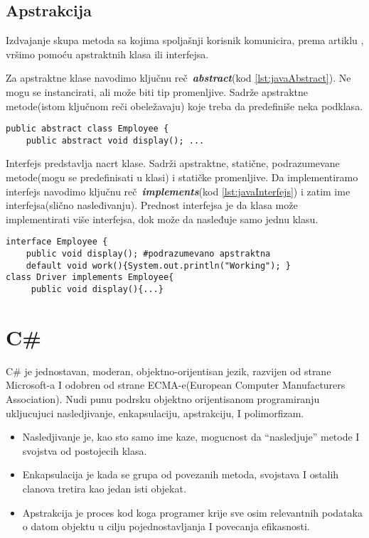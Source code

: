 \documentclass[a4paper]{article}
\begin{document}
\subsection{Apstrakcija}
\label{subsec:javaApstrakcija}

Izdvajanje skupa metoda sa kojima spoljašnji korisnik komunicira, prema artiklu \cite{oopJava}, vršimo pomoću apstraktnih klasa ili interfejsa.

Za apstraktne klase navodimo ključnu reč~{\em \textbf{abstract}}(kod \ref{lst:javaAbstract}). Ne mogu se instancirati, ali može biti tip promenljive. Sadrže apstraktne metode(istom ključnom reči obeležavaju) koje treba da predefiniše neka podklasa.

\begin{lstlisting}[caption={Apstraktna klasa},frame=single, label=lst:javaAbstract]
public abstract class Employee {
	public abstract void display(); ...
\end{lstlisting}

Interfejs predstavlja nacrt klase. Sadrži apstraktne, statične, podrazumevane metode(mogu se predefinisati u klasi) i statičke promenljive. Da implementiramo interfejs navodimo ključnu reč~{\em \textbf{implements}}(kod \ref{lst:javaInterfejs}) i zatim ime interfejsa(slično nasleđivanju). Prednost interfejsa\cite{horstmann2017core} je da klasa može implementirati više interfejsa, dok može da nasleđuje samo jednu klasu.

\begin{lstlisting}[caption={Interfejs},frame=single, label=lst:javaInterfejs]
interface Employee {
	public void display(); #podrazumevano apstraktna
	default void work(){System.out.println("Working"); }
class Driver implements Employee{  
   	 public void display(){...}
\end{lstlisting}


\section{C\#}
\label{sec:csharp}

C\# je jednostavan, moderan, objektno-orijentisan jezik, razvijen od strane Microsoft-a I  odobren od strane ECMA-e(European Computer Manufacturers Association).  Nudi punu podrsku objektno orijentisanom programiranju ukljucujuci nasledjivanje, enkapsulaciju, apstrakciju, I polimorfizam.

\begin{itemize}
  \item Nasledjivanje je, kao sto samo ime kaze, mogucnost da “nasledjuje” metode I svojstva od postojecih klasa.
  \item Enkapsulacija je kada se grupa od povezanih metoda, svojstava I ostalih clanova tretira kao jedan isti objekat.
  \item Apstrakcija je proces kod koga programer krije sve osim relevantnih podataka o datom objektu u cilju pojednostavljanja I povecanja efikasnosti.
\end{itemize}
\end{document}
